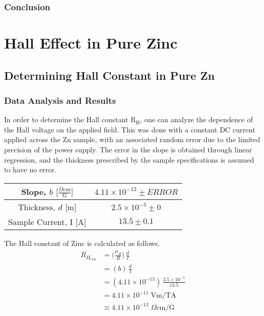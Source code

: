 \documentclass[a4paper]{article}
\begin{document}
\subsubsection{Conclusion}

\section{Hall Effect in Pure Zinc}

\subsection{Determining Hall Constant in Pure Zn}

\subsubsection{Data Analysis and Results}
\qq In order to determine the Hall constant $\text{R}_\text{H}$, one can
analyze the dependence of the Hall voltage on the applied field. This
was done with a constant DC current applied across the Zn sample, with
an associated random error due to the limited precision of the power
supply. The error in the slope is obtained through linear regression,
and the thickness prescribed by the sample specifications is assumed
to have no error.

\begin{center}
\begin{tabular}{|c|c|}
\hline
Slope, $b$ $\big[  \frac{\Omega \text{cm}}{\text{G}} \big] $ & $4.11 \times 10^{-13} \pm ERROR$ \topVspace \bottomVspace \\
\hline
Thickness, $d$ [m] & $2.5 \times 10^{-5} \pm 0$ \topVspace \bottomVspace \\
\hline
Sample Current, I [A] & $13.5 \pm 0.1$ \topVspace \bottomVspace \\
\hline
\end{tabular}
\label{table:zinc_RH}
\end{center}

The Hall constant of Zinc is calculated as follows.
\begin{align*}
R_{H_{exp}} &= \big( \frac{\mu_H}{B} \big) \, \frac{d}{I} \\
    &= (b) \, \frac{d}{I} \\
    &= (4.11 \times 10^{-13}) \, \frac{2.5 \times 10^{-5}}{13.5} \\
    &= 4.11 \times 10^{-11} \; \text{Vm/TA} \\
    &\equiv 4.11 \times 10^{-13} \; \Omega \text{cm/G} \\
\end{align*}
\end{document}
